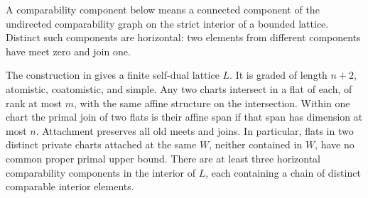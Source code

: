 A comparability component below means a connected component of the
undirected comparability graph on the strict interior of a bounded lattice.
Distinct such components are horizontal: two elements from different
components have meet zero and join one.

\begin{proposition}\label{f:prop-chart-properties}
The construction in  gives a finite self-dual
lattice $L$. It is graded of length $n+2$, atomistic, coatomistic, and simple.
Any two charts intersect in a flat of each, of rank at most $m$, with the
same affine structure on the intersection. Within one chart the primal
join of two flats is their affine span if that span has dimension at most
$n$. Attachment preserves all old meets and joins. In particular, flats in
two distinct private charts attached at the same $W$, neither contained in
$W$, have no common proper primal upper bound. There are at least three
horizontal comparability components in the interior of $L$, each containing
a chain of distinct comparable interior elements.
\end{proposition}
